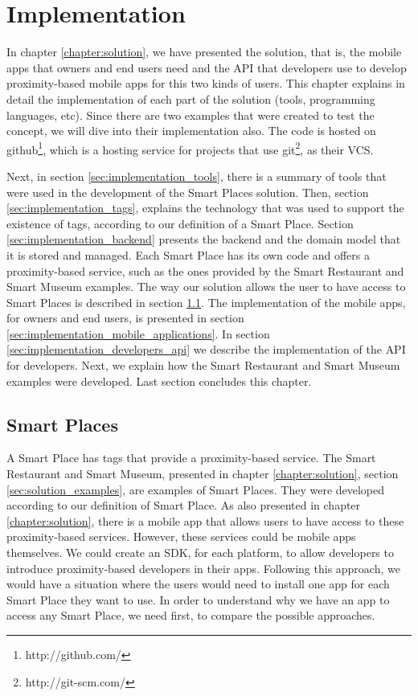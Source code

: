
\chapter{Implementation}
\label{chapter:implementation}
In chapter \ref{chapter:solution}, we have presented the solution, that is,
the mobile apps that owners and end users need and the \gls{API} that developers use
to develop proximity-based mobile apps for this two kinds of users.
This chapter explains in detail the implementation of each part of the solution
(tools, programming languages, etc). Since there are two examples that were
created to test the concept, we will dive into their implementation also.
The code is hosted on
github\footnote{http://github.com/}, which is a hosting service for projects
that use git\footnote{http://git-scm.com/}, as their \gls{VCS}.

Next, in section \ref{sec:implementation_tools}, there is a summary of tools that were used in the development of the Smart Places solution.
Then, section \ref{sec:implementation_tags}, explains the technology that was used to support the existence of tags, according to our definition of a Smart Place.
Section \ref{sec:implementation_backend} presents the backend and the domain model that it is stored and managed.
Each Smart Place has its own code and offers a proximity-based service, such as the ones provided by the Smart Restaurant and Smart Museum examples.
The way our solution allows the user to have access to Smart Places is described in section \ref{sec:implementation_smart_places}.
The implementation of the mobile apps, for owners and end users, is presented in section \ref{sec:implementation_mobile_applications}.
In section \ref{sec:implementation_developers_api} we describe the implementation of the \gls{API} for developers.
Next, we explain how the Smart Restaurant and Smart Museum examples were developed.
Last section concludes this chapter.

\section{Smart Places}
\label{sec:implementation_smart_places}
A Smart Place has tags that provide a proximity-based service.
The Smart Restaurant and Smart Museum, presented in chapter \ref{chapter:solution}, section \ref{sec:solution_examples}, are examples of Smart Places.
They were developed according to our definition of Smart Place.
As also presented in chapter \ref{chapter:solution}, there is a mobile app that allows users to have access to these proximity-based services.
However, these services could be mobile apps themselves.
We could create an \gls{SDK}, for each platform, to allow developers to introduce proximity-based developers in their apps.
Following this approach, we would have a situation where the users would need to install one app for each Smart Place they want to use.
In order to understand why we have an app to access any Smart Place, we need first, to compare the possible approaches.

